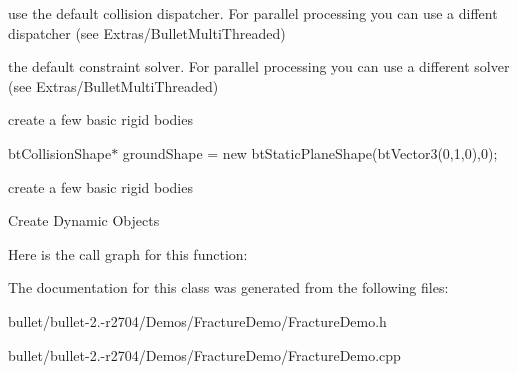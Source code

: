 use the default collision dispatcher. For parallel processing you can use a diffent dispatcher (see Extras/\+Bullet\+Multi\+Threaded)

the default constraint solver. For parallel processing you can use a different solver (see Extras/\+Bullet\+Multi\+Threaded)

create a few basic rigid bodies

bt\+Collision\+Shape$\ast$ ground\+Shape = new bt\+Static\+Plane\+Shape(bt\+Vector3(0,1,0),0);

create a few basic rigid bodies

Create Dynamic Objects 

Here is the call graph for this function\+:




The documentation for this class was generated from the following files\+:\begin{DoxyCompactItemize}
\item 
bullet/bullet-\/2.-\/r2704/\+Demos/\+Fracture\+Demo/Fracture\+Demo.\+h\item 
bullet/bullet-\/2.-\/r2704/\+Demos/\+Fracture\+Demo/Fracture\+Demo.\+cpp\end{DoxyCompactItemize}
